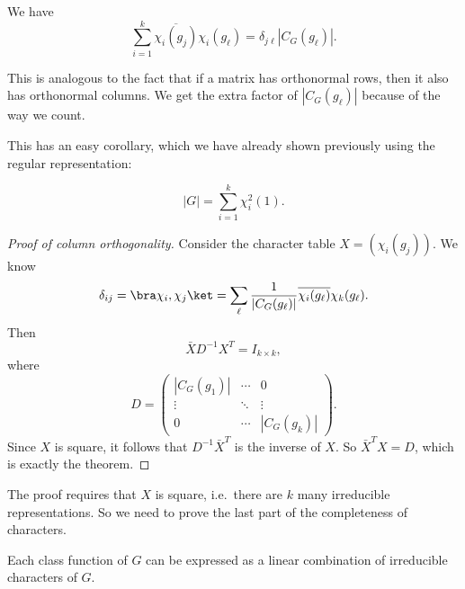 \documentclass[a4paper]{article}
\begin{document}
\begin{thm}
  We have
  \[
    \sum_{i = 1}^k \overline{\chi_i (g_j)}\chi_i (g_\ell) = \delta_{j\ell} |C_G(g_\ell)|.
  \]
\end{thm}
This is analogous to the fact that if a matrix has orthonormal rows, then it also has orthonormal columns. We get the extra factor of $|C_G(g_\ell)|$ because of the way we count.

This has an easy corollary, which we have already shown previously using the regular representation:
\begin{cor}
  \[
    |G| = \sum_{i = 1}^k \chi_i^2 (1).
  \]
\end{cor}

\begin{proof}[Proof of column orthogonality]
  Consider the character table $X = (\chi_i(g_j))$. We know
  \[
    \delta_{ij} = \bra \chi_i, \chi_j\ket = \sum_\ell \frac{1}{|C_G(g_\ell)|}\overline{\chi_i(g_\ell)} \chi_k(g_\ell).
  \]
  Then
  \[
    \bar{X} D^{-1} X^T = I_{k\times k},
  \]
  where
  \[
    D =
    \begin{pmatrix}
      |C_G(g_1)| & \cdots & 0\\
      \vdots & \ddots & \vdots\\
      0 & \cdots & |C_G(g_k)|
    \end{pmatrix}.
  \]
  Since $X$ is square, it follows that $D^{-1} \bar{X}^T$ is the inverse of $X$. So $\bar{X}^T X = D$, which is exactly the theorem.
\end{proof}
The proof requires that $X$ is square, i.e.\ there are $k$ many irreducible representations. So we need to prove the last part of the completeness of characters.

\begin{thm}
  Each class function of $G$ can be expressed as a linear combination of irreducible characters of $G$.
\end{thm}
\end{document}
